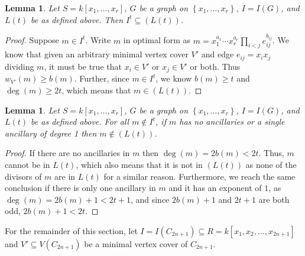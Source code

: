 \documentclass[12pt]{amsart}
\def\set#1{\left\{ {#1} \right\}}
\renewcommand{\geq}{\geqslant}
\theoremstyle{plain}
\newtheorem{lem}[theorem]{Lemma}
\theoremstyle{definition}
\begin{document}
\begin{lem}\label{lem:it sub lt}
  Let $S=k[x_1,\ldots,x_r]$, $G$ be a graph on $\set{x_1,\ldots,x_r}$, $I=I(G)$, and $L(t)$ be as defined above. Then $I^t \subseteq (L(t))$.
\end{lem}

\begin{proof}
  Suppose $m \in I^t$. 
  Write $m$ in optimal form as $m = x_1^{a_1} \cdots x_r^{a_r} \prod_{i < j} e_{ij}^{b_{ij}}$. 
  We know that given an arbitrary minimal vertex cover $V'$ and edge $e_{ij} = x_i x_j$ dividing $m$, it must be true that $x_i \in V'$ or $x_j \in V'$ or both. 
  Thus $w_{V'}(m) \geq b(m)$. 
  Further, since $m \in I^t$, we know $b(m) \geq t$ and $\deg(m) \geq 2t$, which means that $m \in (L(t))$.
\end{proof}

\begin{lem}\label{lem:m12 not in lt}
  Let $S=k[x_1,\ldots,x_r]$, $G$ be a graph on $\set{x_1,\ldots,x_r}$, $I=I(G)$, and $L(t)$ be as defined above. 
  For all $m \not\in I^t$, if $m$ has no ancillaries or a single ancillary of degree 1 then $m \not\in (L(t))$.
\end{lem}

\begin{proof}
  If there are no ancillaries in $m$ then $\deg(m) = 2 b(m) < 2t$. 
  Thus, $m$ cannot be in $L(t)$, which also means that it is not in $(L(t))$ as none of the divisors of $m$ are in $L(t)$ for a similar reason. 
  Furthermore, we reach the same conclusion if there is only one ancillary in $m$ and it has an exponent of $1$, as $\deg(m) = 2b(m)+1 < 2t+1$, and since $2b(m)+1$ and $2t+1$ are both odd, $2b(m)+1 < 2t$.
\end{proof}

For the remainder of this section, let $I=I(C_{2n+1}) \subseteq R=  k[x_1,x_2,\ldots,x_{2n+1}]$ and $V' \subseteq V(C_{2n+1})$ be a minimal vertex cover of $C_{2n+1}$.
\end{document}
